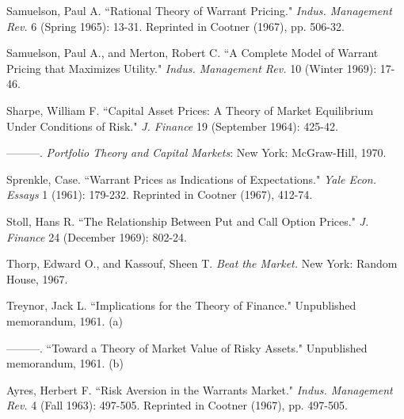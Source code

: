 \documentclass[a4paper, 12pt, twoside]{article}
\begin{document}
\hangindent 5mm
\noindent Samuelson, Paul A. ``Rational Theory of Warrant Pricing." \textit{Indus. Management Rev.} 6 
(Spring 1965): 13-31. Reprinted in Cootner (1967), pp. 506-32.

\hangindent 5mm
\noindent Samuelson, Paul A., and Merton, Robert C. ``A Complete Model of Warrant Pricing that 
Maximizes Utility." \textit{Indus. Management Rev.} 10 (Winter 1969): 17-46.

\hangindent 5mm
\noindent Sharpe, William F. ``Capital Asset Prices: A Theory of Market Equilibrium Under 
Conditions of Risk." \textit{J. Finance} 19 (September 1964): 425-42.

\hangindent 5mm
\noindent ---------. \textit{Portfolio Theory and Capital Markets}: New York: McGraw-Hill, 1970.

\hangindent 5mm
\noindent Sprenkle, Case. ``Warrant Prices as Indications of Expectations." \textit{Yale Econ. Essays} 1 
(1961):  179-232.  Reprinted in Cootner (1967), 412-74.

\hangindent 5mm
\noindent Stoll, Hans R. ``The Relationship Between Put and Call Option Prices." \textit{J. Finance} 24 
(December 1969): 802-24.

\hangindent 5mm
\noindent Thorp, Edward O., and Kassouf, Sheen T. \textit{Beat the Market.} New York: Random House, 1967.

\hangindent 5mm
\noindent Treynor, Jack L. ``Implications for the Theory of Finance." Unpublished memorandum, 
1961. (a)

\hangindent 5mm
\noindent ---------. ``Toward a Theory of Market Value of Risky Assets." Unpublished memorandum, 
1961. (b)

\endgroup 

\begin{thebibliography}{9}
Ayres, Herbert F. 
``Risk Aversion in the Warrants Market." 
\textit{Indus. Management Rev.} 4 
(Fall 1963): 497-505.  Reprinted in Cootner (1967), pp. 497-505.
\end{thebibliography}
\end{document}
